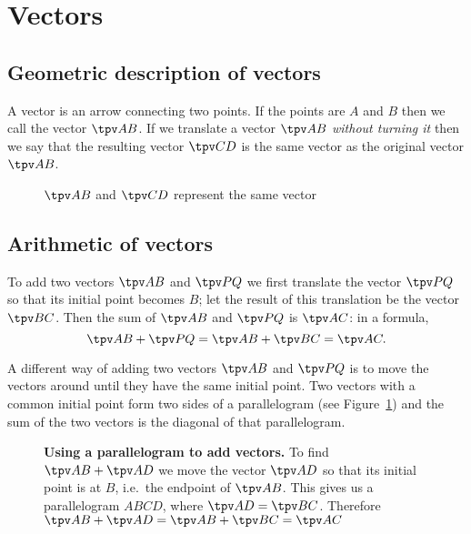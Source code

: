 \documentclass{amsart}
\begin{document}
\section{Vectors}

\subsection{Geometric description of vectors}
\label{sec:geometric-description-of-vectors}
A vector is an arrow connecting two points.  If the points are $A$ and $B$ then we
call the vector $\tpv AB$. If we translate a vector $\tpv AB$ \emph{without turning
it} then we say that the resulting vector $\tpv CD$ is the same vector as the
original vector $\tpv AB$.
\begin{figure}[h]\centering
  
  \caption{$\tpv AB$ and $\tpv CD$ represent the same vector}
\end{figure}

\subsection{Arithmetic of vectors}
\label{sec:arithmetic-of-vectors}
To add two vectors $\tpv AB$ and $\tpv PQ$ we first translate the vector $\tpv PQ$ so
that its initial point becomes $B$; let the result of this translation be the vector
$\tpv BC$.  Then the sum of $\tpv AB$ and $\tpv PQ$ is $\tpv AC$: in a formula,
\[
\tpv AB + \tpv PQ = \tpv AB + \tpv BC = \tpv AC.
\]

\begin{figure}[h]
  \def\figfont{\sffamily\footnotesize\color{darkbluegreen}\centering}
  \def\addingvectorsCapA{\parbox{1in}{\figfont%
  to add\\
  two vectors\dots}}
  \def\addingvectorsCapB{\parbox{1in}{\figfont%
  \dots move one vector until its initial point\dots}}
  \def\addingvectorsCapC{\parbox{1in}{\figfont%
  \dots is the end point of the other\dots} }
  \def\addingvectorsCapD{\parbox{1in}{\figfont%
  \dots and combine them.} }

\end{figure}
A different way of adding two vectors $\tpv AB$ and $\tpv PQ$ is to move the vectors
around until they have the same initial point.  Two vectors with a common initial
point form two sides of a parallelogram (see
Figure~\ref{fig:adding-vectors-parallelogram}) and the sum of the two vectors is the
diagonal of that parallelogram.
\begin{figure}[h]
  
  \caption{{\bfseries Using a parallelogram to add vectors. }
  To find $\tpv AB  + \tpv AD$ we move the vector $\tpv AD$ so that its initial point
  is at $B$, i.e.~the endpoint of $\tpv AB$.  This gives us a 
  parallelogram $ABCD$, where $\tpv AD = \tpv BC$.  Therefore $\tpv AB+\tpv AD = \tpv
  AB+\tpv BC = \tpv AC$ }
  \label{fig:adding-vectors-parallelogram}
\end{figure}
\end{document}
